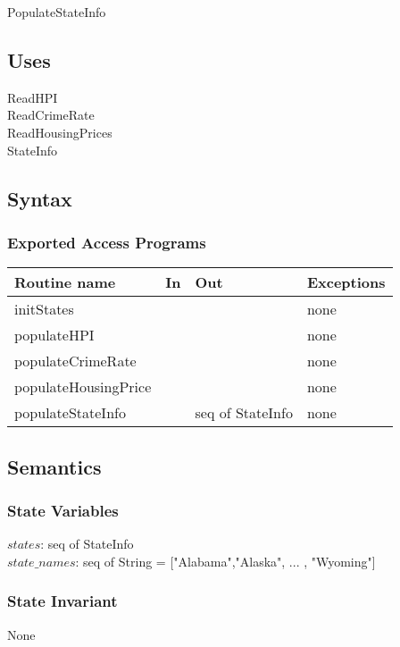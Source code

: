 \documentclass[12pt]{article}
\begin{document}
PopulateStateInfo

\subsection* {Uses}

ReadHPI\\
ReadCrimeRate\\
ReadHousingPrices\\
StateInfo\\

\subsection* {Syntax}

\subsubsection* {Exported Access Programs}

\begin{tabular}{| l | l | l | p{5cm} |}
\hline
\textbf{Routine name} & \textbf{In} & \textbf{Out} & \textbf{Exceptions}\\
\hline
initStates &  &  & none\\
\hline
populateHPI & & & none\\
\hline
populateCrimeRate & & & none\\
\hline
populateHousingPrice & & & none\\
\hline
populateStateInfo & & seq of StateInfo & none\\
\hline
\end{tabular}

\subsection* {Semantics}

\subsubsection* {State Variables}

$states$: seq of StateInfo\\
$state\_names$: seq of String = ["Alabama","Alaska", ... , "Wyoming"]

\subsubsection* {State Invariant}

None
\end{document}

